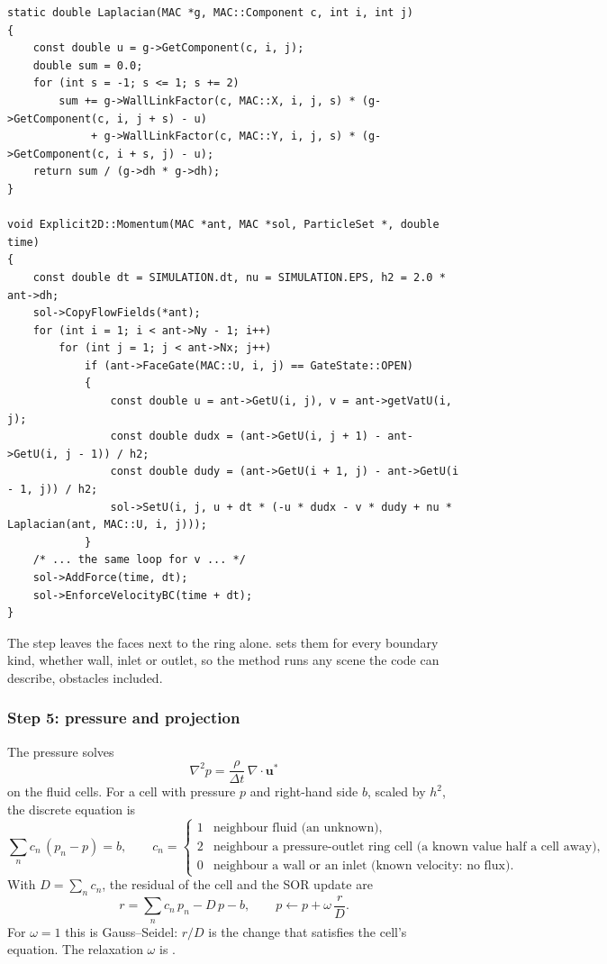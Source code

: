 \documentclass[10pt,a4paper]{article}
\newcommand{\code}[1]{\texttt{\detokenize{#1}}}
\begin{document}
\begin{lstlisting}[style=ex]
static double Laplacian(MAC *g, MAC::Component c, int i, int j)
{
    const double u = g->GetComponent(c, i, j);
    double sum = 0.0;
    for (int s = -1; s <= 1; s += 2)
        sum += g->WallLinkFactor(c, MAC::X, i, j, s) * (g->GetComponent(c, i, j + s) - u)
             + g->WallLinkFactor(c, MAC::Y, i, j, s) * (g->GetComponent(c, i + s, j) - u);
    return sum / (g->dh * g->dh);
}

void Explicit2D::Momentum(MAC *ant, MAC *sol, ParticleSet *, double time)
{
    const double dt = SIMULATION.dt, nu = SIMULATION.EPS, h2 = 2.0 * ant->dh;
    sol->CopyFlowFields(*ant);
    for (int i = 1; i < ant->Ny - 1; i++)
        for (int j = 1; j < ant->Nx; j++)
            if (ant->FaceGate(MAC::U, i, j) == GateState::OPEN)
            {
                const double u = ant->GetU(i, j), v = ant->getVatU(i, j);
                const double dudx = (ant->GetU(i, j + 1) - ant->GetU(i, j - 1)) / h2;
                const double dudy = (ant->GetU(i + 1, j) - ant->GetU(i - 1, j)) / h2;
                sol->SetU(i, j, u + dt * (-u * dudx - v * dudy + nu * Laplacian(ant, MAC::U, i, j)));
            }
    /* ... the same loop for v ... */
    sol->AddForce(time, dt);
    sol->EnforceVelocityBC(time + dt);
}
\end{lstlisting}
The step leaves the faces next to the ring alone. \code{EnforceVelocityBC} sets them for every boundary kind, whether
wall, inlet or outlet, so the method runs any scene the code can describe, obstacles included.

\subsubsection*{Step 5: pressure and projection}

The pressure solves
\begin{equation*}
  \nabla^2 p = \frac{\rho}{\Delta t}\,\nabla\cdot\mathbf u^*
\end{equation*}
on the fluid cells. For a cell with pressure $p$ and right-hand side $b$, scaled by $h^2$, the discrete equation is
\begin{equation*}
  \sum_{n} c_n\,(p_n - p) = b, \qquad
  c_n = \begin{cases} 1 & \text{neighbour fluid (an unknown)},\\
                      2 & \text{neighbour a pressure-outlet ring cell (a known value half a cell away)},\\
                      0 & \text{neighbour a wall or an inlet (known velocity: no flux)}.\end{cases}
\end{equation*}
With $D = \sum_n c_n$, the residual of the cell and the SOR update are
\begin{equation*}
  r = \sum_n c_n\,p_n - D\,p - b, \qquad p \leftarrow p + \omega\,\frac{r}{D}.
\end{equation*}
For $\omega = 1$ this is Gauss--Seidel: $r/D$ is the change that satisfies the cell's equation. The relaxation
$\omega$ is \code{EXPLICIT_RELAXATION}.
\end{document}

